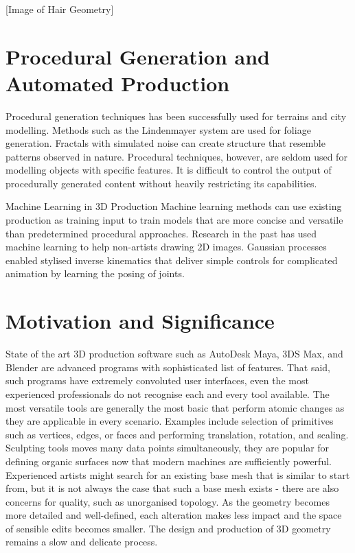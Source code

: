 \documentclass[ %
                    author={Dillon Keith Diep},
                supervisor={Dr. Carl Henrik Ek},
                    degree={MEng},
                     title={Assisted Content Generation for 3D Hair Geometry},
                  subtitle={[INCOMPLETE DRAFT, CONTAINS NOTES FROM RESEARCH]},
                      type={Research},
                      year={2014} ]{dissertation}
\begin{document}
[Image of Hair Geometry]

\section{Procedural Generation and Automated Production}
\noindent
Procedural generation techniques has been successfully used for terrains and city modelling. Methods such as the Lindenmayer system are used for foliage generation. Fractals with simulated noise can create structure that resemble patterns observed in nature. Procedural techniques, however, are seldom used for modelling objects with specific features. It is difficult to control the output of procedurally generated content without heavily restricting its capabilities.
\cite{procedural1}
\cite{procedural2}

Machine Learning in 3D Production
Machine learning methods can use existing production as training input to train models that are more concise and versatile than predetermined procedural approaches. Research in the past has used machine learning to help non-artists drawing 2D images. Gaussian processes enabled stylised inverse kinematics that deliver simple controls for complicated animation by learning the posing of joints. 
\cite{MLMethods}

\section{Motivation and Significance}
\noindent
State of the art 3D production software such as AutoDesk Maya, 3DS Max, and Blender are advanced programs with sophisticated list of features. That said, such programs have extremely convoluted user interfaces, even the most experienced professionals do not recognise each and every tool available. The most versatile tools are generally the most basic that perform atomic changes as they are applicable in every scenario. Examples include selection of primitives such as vertices, edges, or faces and performing translation, rotation, and scaling. Sculpting tools moves many data points simultaneously, they are popular for defining organic surfaces now that modern machines are sufficiently powerful. Experienced artists might search for an existing base mesh that is similar to start from, but it is not always the case that such a base mesh exists - there are also concerns for quality, such as unorganised topology. As the geometry becomes more detailed and well-defined, each alteration makes less impact and the space of sensible edits becomes smaller. The design and production of 3D geometry remains a slow and delicate process.
\end{document}
